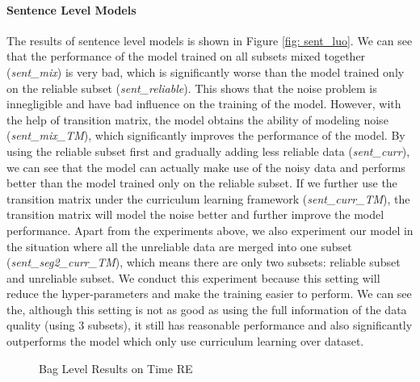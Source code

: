 \documentclass[11pt,a4paper]{article}
\begin{document}
\paragraph{Sentence Level Models}
The results of sentence level models is shown in Figure \ref{fig: sent_luo}. We can see that the performance of the model trained on all subsets mixed together (\emph{sent\_mix}) is very bad, which is significantly worse than the model trained only on the reliable subset (\emph{sent\_reliable}). This shows that the noise problem is innegligible and have bad influence on the training of the model. However, with the help of transition matrix, the model obtains the ability of modeling noise (\emph{sent\_mix\_TM}), which significantly improves the performance of the model. By using the reliable subset first and gradually adding less reliable data (\emph{sent\_curr}), we can see that the model can actually make use of the noisy data and performs better than the model trained only on the reliable subset. If we further use the transition matrix under the curriculum learning framework (\emph{sent\_curr\_TM}), the transition matrix will model the noise better and further improve the model performance. Apart from the experiments above, we also experiment our model in the situation where all the unreliable data are merged into one subset (\emph{sent\_seg2\_curr\_TM}), which means there are only two subsets: reliable subset and unreliable subset. We conduct this experiment because this setting will reduce the hyper-parameters and make the training easier to perform. We can see the, although this setting is not as good as using the full information of the data quality (using 3 subsets), it still has reasonable performance and also significantly outperforms the model which only use curriculum learning over dataset.


\begin{figure}[htbp]
\centering
{}
\caption{Bag Level Results on Time RE}
\label{fig: results_on_luo}
\end{figure}
\end{document}
